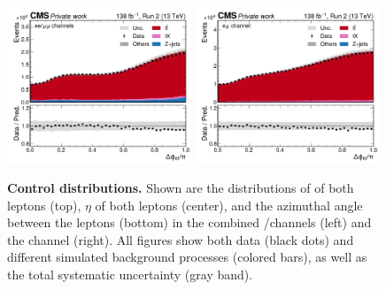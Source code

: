 \begin{figure}[!hp]
    \includegraphics[width=0.49\textwidth]{figures/ah/controlplots/ReqMET/lep_deltaphi__sf.pdf}
    \hfill
    \includegraphics[width=0.49\textwidth]{figures/ah/controlplots/ReqMET/lep_deltaphi__em.pdf}
    \caption{
        \textbf{Control distributions.} Shown are the distributions of \pt of both leptons (top), $\eta$ of both leptons (center), and the azimuthal angle \dphill between the leptons (bottom) in the combined \ee/\mumu channels (left) and the \emu channel (right). All figures show both data (black dots) and different simulated background processes (colored bars), as well as the total systematic uncertainty (gray band). 
    }
    \label{fig:ah:control1}
\end{figure}

